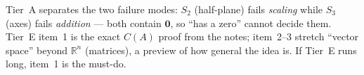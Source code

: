 \documentclass[10pt]{article}
\newcommand{\zero}{\mathbf{0}}
\begin{document}
\begin{teachernote}
Tier~A separates the two failure modes: $S_2$ (half-plane) fails \emph{scaling} while $S_3$ (axes)
fails \emph{addition} --- both contain $\zero$, so ``has a zero'' cannot decide them. Tier~E item~1
is the exact $C(A)$ proof from the notes; item~2--3 stretch ``vector space'' beyond $\mathbb{R}^n$
(matrices), a preview of how general the idea is. If Tier~E runs long, item~1 is the must-do.
\end{teachernote}
\end{document}
